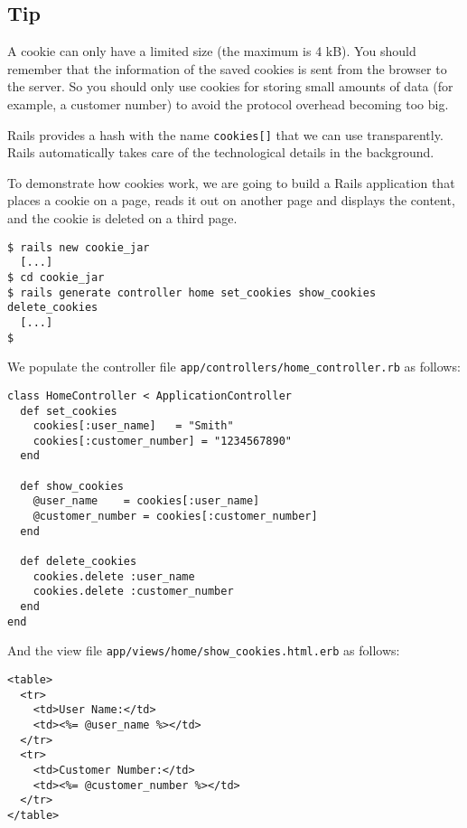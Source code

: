 \documentclass[a4paper]{book}
\newcounter{tab}[chapter]
\begin{document}
\subsection{Tip}\label{tip-17}

A cookie can only have a limited size (the maximum is 4 kB). You should remember that the information of the saved cookies is sent from the browser to the server. So you should only use cookies for storing small amounts of data (for example, a customer number) to avoid the protocol overhead becoming too big.

Rails provides a hash with the name \texttt{cookies{[}{]}} that we can use transparently. Rails automatically takes care of the technological details in the background.

To demonstrate how cookies work, we are going to build a Rails application that places a cookie on a page, reads it out on another page and displays the content, and the cookie is deleted on a third page.

\begin{shaded}\begin{verbatim}
$ rails new cookie_jar
  [...]
$ cd cookie_jar
$ rails generate controller home set_cookies show_cookies delete_cookies
  [...]
$
\end{verbatim}\end{shaded}

We populate the controller file \texttt{app/controllers/home\_controller.rb} as follows:

\begin{shaded}\begin{verbatim}
class HomeController < ApplicationController
  def set_cookies
    cookies[:user_name]   = "Smith"
    cookies[:customer_number] = "1234567890"
  end

  def show_cookies
    @user_name    = cookies[:user_name]
    @customer_number = cookies[:customer_number]
  end

  def delete_cookies
    cookies.delete :user_name
    cookies.delete :customer_number
  end
end
\end{verbatim}\end{shaded}

And the view file \texttt{app/views/home/show\_cookies.html.erb} as follows:

\begin{shaded}\begin{verbatim}
<table>
  <tr>
    <td>User Name:</td>
    <td><%= @user_name %></td>
  </tr>
  <tr>
    <td>Customer Number:</td>
    <td><%= @customer_number %></td>
  </tr>
</table>
\end{verbatim}\end{shaded}
\end{document}
